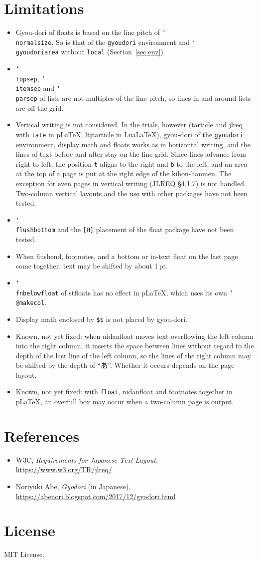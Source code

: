 \documentclass[paper=a4,dvipdfmx]{jlreq}
\newcommand\pkg[1]{\textsf{#1}}
\newcommand\opt[1]{\texttt{#1}}
\newcommand\env[1]{\texttt{#1}}
\newcommand\cs[1]{\texttt{\char`\\#1}}
\begin{document}
\section{Limitations}\label{sec:limit}

\begin{itemize}
\item Gyou-dori of floats is based on the line pitch of \cs{normalsize}. So is
  that of the \env{gyoudori} environment and \cs{gyoudoriarea} without
  \opt{local} (Section~\ref{sec:env}).
\item \cs{topsep}, \cs{itemsep} and \cs{parsep} of lists are not multiples of
  the line pitch, so lines in and around lists are off the grid.
\item Vertical writing is not considered. In the trials, however (\pkg{tarticle}
  and \pkg{jlreq} with \opt{tate} in pLaTeX, \pkg{ltjtarticle} in LuaLaTeX),
  gyou-dori of the \env{gyoudori} environment, display math and floats works as
  in horizontal writing, and the lines of text before and after stay on the line
  grid. Since lines advance from right to left, the position \opt{t} aligns to
  the right and \opt{b} to the left, and an area at the top of a page is put at
  the right edge of the kihon-hanmen. The exception for even pages in vertical
  writing (JLREQ \S4.1.7) is not handled. Two-column vertical layouts and the
  use with other packages have not been tested.
\item \cs{flushbottom} and the \opt{[H]} placement of the \pkg{float} package
  have not been tested.
\item When \pkg{flushend}, footnotes, and a bottom or in-text float on the last page
  come together, text may be shifted by about 1\,pt.
\item \cs{fnbelowfloat} of \pkg{stfloats} has no effect in pLaTeX, which uses
  its own \cs{@makecol}.
\item Display math enclosed by \verb|$$| is not placed by gyou-dori.
\item Known, not yet fixed: when \pkg{nidanfloat} moves text overflowing the left
  column into the right column, it inserts the space between lines without
  regard to the depth of the last line of the left column, so the lines of the
  right column may be shifted by the depth of ``あ''. Whether it occurs depends
  on the page layout.
\item Known, not yet fixed: with \opt{float}, \pkg{nidanfloat} and footnotes
  together in pLaTeX, an overfull box may occur when a two-column page is output.
\end{itemize}

\section{References}

\begin{itemize}
\item W3C, \textit{Requirements for Japanese Text Layout},
  \url{https://www.w3.org/TR/jlreq/}
\item Noriyuki Abe, \textit{Gyodori} (in Japanese),
  \url{https://abenori.blogspot.com/2017/12/gyodori.html}
\end{itemize}

\section{License}

MIT License.
\end{document}
